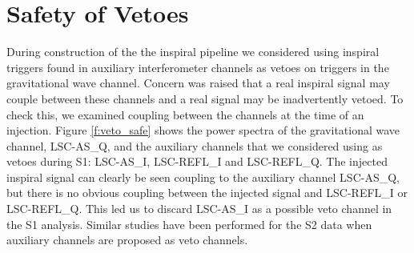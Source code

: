 \section{Safety of Vetoes}
\label{s:safety}

During construction of the the inspiral pipeline we considered using inspiral
triggers found in auxiliary interferometer channels as vetoes on triggers in
the gravitational wave channel. Concern was raised that a real inspiral signal
may couple between these channels and a real signal may be inadvertently
vetoed.  To check this, we examined coupling between the channels at the time
of an injection.  Figure \ref{f:veto_safe} shows the power spectra of the
gravitational wave channel, LSC-AS\_Q, and the auxiliary channels that we
considered using as vetoes during S1: LSC-AS\_I, LSC-REFL\_I and
LSC-REFL\_Q.  The injected inspiral signal can clearly be seen coupling
to the auxiliary channel LSC-AS\_Q, but there is no obvious coupling
between the injected signal and LSC-REFL\_I or LSC-REFL\_Q. This
led us to discard LSC-AS\_I as a possible veto channel in the S1
analysis. Similar studies have been performed for the S2 data when auxiliary
channels are proposed as veto channels.

\newpage

